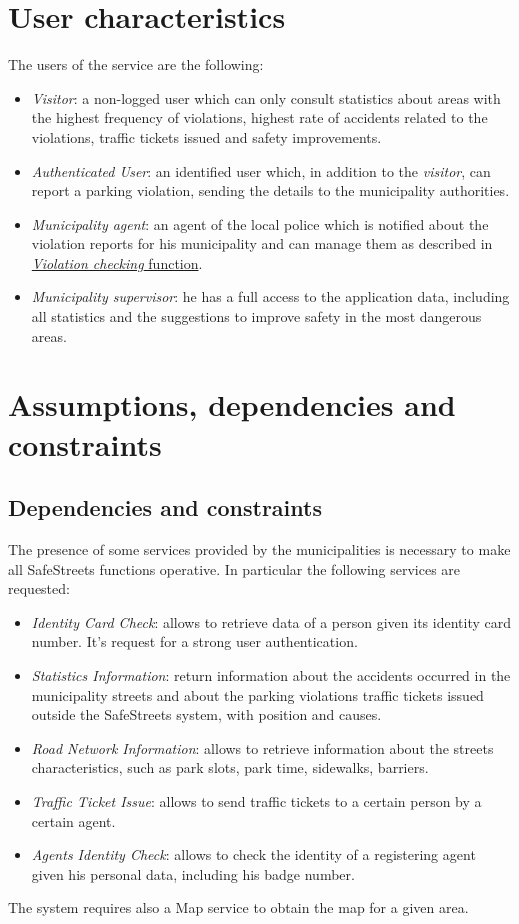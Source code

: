 \documentclass[a4paper]{report}
\begin{document}
\section{User characteristics}
The users of the service are the following:
\begin{itemize}
\item \textit{Visitor}: a non-logged user which can only consult statistics about areas with the highest frequency of violations, highest rate of accidents related to the violations, traffic tickets issued and safety improvements.
\item \textit{Authenticated User}: an identified user which, in addition to the \textit{visitor}, can report a parking violation, sending the details to the municipality authorities.
\item \textit{Municipality agent}: an agent of the local police which is notified about the violation reports for his municipality and can manage them as described in \hyperref[sub-agentfun]{\textit{Violation checking} function}.
\item \textit{Municipality supervisor}: he has a full access to the application data, including all statistics and the suggestions to improve safety in the most dangerous areas.
\end{itemize}
\section{Assumptions, dependencies and constraints}
\subsection{Dependencies and constraints}
\label{SS-Dep&Const} 
The presence of some services provided by the municipalities is necessary to make all SafeStreets functions operative. In particular the following services are requested:
\begin{itemize}
\item \textit{Identity Card Check}: allows to retrieve data of a person given its identity card number.  It's request for a strong user authentication.
\item \textit{Statistics Information}: return information about the accidents occurred in the municipality streets and about the parking violations traffic tickets issued outside the SafeStreets system, with position and causes.
\item \textit{Road Network Information}: allows to retrieve information about the streets characteristics, such as park slots, park time, sidewalks, barriers.
\item \textit{Traffic Ticket Issue}: allows to send traffic tickets to a certain person by a certain agent.
\item \textit{Agents Identity Check}: allows to check the identity of a registering agent given his personal data, including his badge number. 
\end{itemize}
The system requires also a Map service to obtain the map for a given area. 
\end{document}

